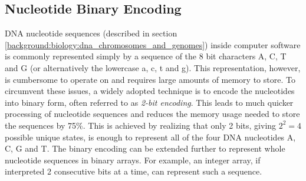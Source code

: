 \subsection{Nucleotide Binary Encoding} \label{background:nucleotide_binary_encoding}

DNA nucleotide sequences (described in section \ref{background:biology:dna_chromosomes_and_genomes}) inside computer software is commonly represented simply by a sequence of the 8 bit characters A, C, T and G (or alternatively the lowercase a, c, t and g).
This representation, however, is cumbersome to operate on and requires large amounts of memory to store.
To circumvent these issues, a widely adopted technique is to encode the nucleotides into binary form, often referred to as \textit{2-bit encoding}.
This leads to much quicker processing of nucleotide sequences and reduces the memory usage needed to store the sequences by 75\%.
This is achieved by realizing that only 2 bits, giving \textit{$2^2=4$} possible unique states, is enough to represent all of the four DNA nucleotides A, C, G and T.
The binary encoding can be extended further to represent whole nucleotide sequences in binary arrays.
For example, an integer array, if interpreted 2 consecutive bits at a time, can represent such a sequence.

